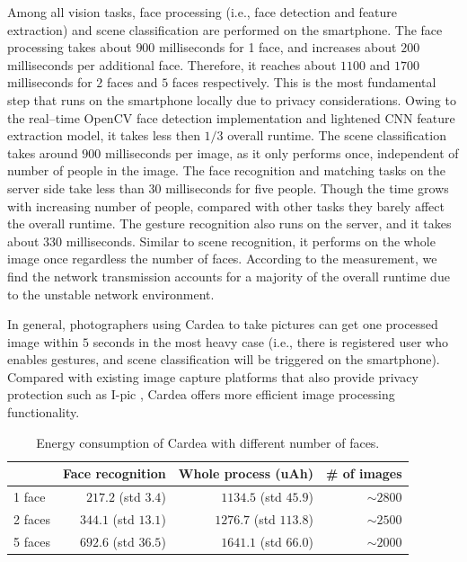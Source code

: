 Among all vision tasks, face processing (i.e., face detection and feature extraction) and scene classification are performed on the smartphone. The face processing takes about $900$ milliseconds for 1 face, and increases about $200$ milliseconds per additional face. Therefore, it reaches about $1100$ and $1700$ milliseconds for $2$ faces and $5$ faces respectively. This is the most fundamental step that runs on the smartphone locally due to privacy considerations. Owing to the real--time OpenCV face detection implementation and lightened CNN feature extraction model, it takes less then $1/3$ overall runtime. The scene classification takes around $900$ milliseconds per image, as it only performs once, independent of number of people in the image. The face recognition and matching tasks on the server side take less than $30$ milliseconds for five people. Though the time grows with increasing number of people, compared with other tasks they barely affect the overall runtime. The gesture recognition also runs on the server, and it takes about $330$ milliseconds. Similar to scene recognition, it performs on the whole image once regardless the number of faces. According to the measurement, we find the network transmission accounts for a majority of the overall runtime due to the unstable network environment.

In general, photographers using Cardea to take pictures can get one processed image within $5$ seconds in the most heavy case (i.e., there is registered user who enables gestures, and scene classification will be triggered on the smartphone). Compared with existing image capture platforms that also provide privacy protection such as I-pic \cite{aditya2016pic}, Cardea offers more efficient image processing functionality.

\begin{table}[tb]
\centering
\caption{Energy consumption of Cardea with different number of faces.}
\label{tbl-energy}
\begin{tabular}{lrrr}
\toprule
            & Face recognition      & Whole process (uAh)   & \# of images \\ \midrule
1 face      & $217.2$ (std $3.4$)   & $1134.5$ (std $45.9$) & $\sim 2800$       \\
2 faces     & $344.1$ (std $13.1$)  & $1276.7$ (std $113.8$)    & $\sim 2500$       \\
5 faces     & $692.6$ (std $36.5$)  & $1641.1$ (std $66.0$) & $\sim 2000$       \\ \bottomrule
\end{tabular}
\end{table}

